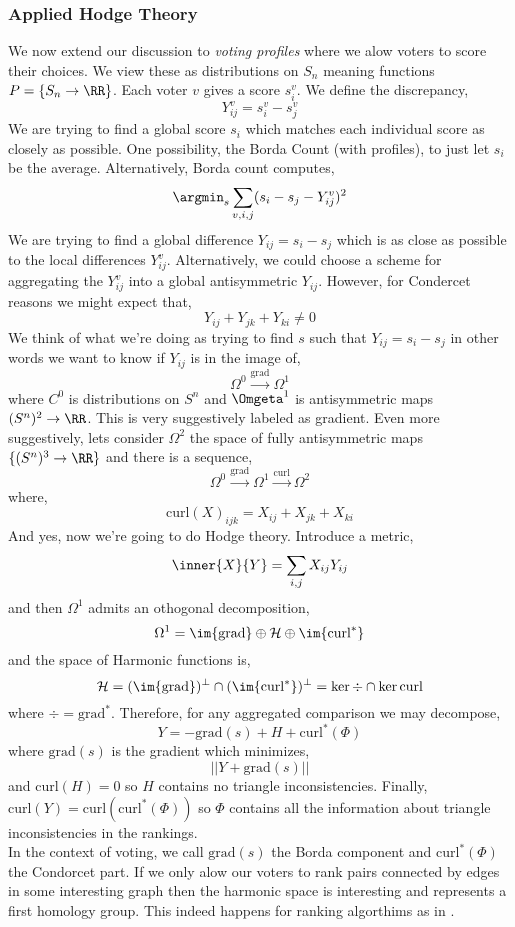 \documentclass[12pt]{article}
\begin{document}
\newcommand{\grad}{\mathrm{grad}}
\newcommand{\curl}{\mathrm{curl}}

\subsubsection{Applied Hodge Theory}

We now extend our discussion to \textit{voting profiles} where we alow voters to score their choices. We view these as distributions on $S_n$ meaning functions $P = \{ S_n \to \RR \}$. Each voter $v$ gives a score $s^v_i$. We define the discrepancy,
\[ Y^v_{ij} = s^v_i - s^v_j \]
We are trying to find a global score $s_i$ which matches each individual score as closely as possible. One possibility, the Borda Count (with profiles), to just let $s_i$ be the average. Alternatively, Borda count computes,
\[ \argmin_{s} \sum_{v, i,j} (s_i - s_j - Y_{ij}^v)^2 \]
We are trying to find a global difference $Y_{ij} = s_i - s_j$ which is as close as possible to the local differences $Y_{ij}^v$. Alternatively, we could choose a scheme for aggregating the $Y_{ij}^v$ into a global antisymmetric $Y_{ij}$. However, for Condercet reasons we might expect that,
\[ Y_{ij} + Y_{jk} + Y_{ki} \neq 0 \]
We think of what we're doing as trying to find $s$ such that $Y_{ij} = s_i - s_j$ in other words we want to know if $Y_{ij}$ is in the image of,
\[ \Omega^0 \xrightarrow{\grad} \Omega^1 \]
where $C^0$ is distributions on $S^n$ and $\Omgeta^1$ is antisymmetric maps $(S^n)^2 \to \RR$. This is very suggestively labeled as gradient. Even more suggestively, lets consider $\Omega^2$ the space of fully antisymmetric maps $\{ (S^n)^3 \to \RR \}$ and there is a sequence,
\[ \Omega^0 \xrightarrow{\grad} \Omega^1 \xrightarrow{\curl} \Omega^2 \]
where,
\[ \mathrm{curl}(X)_{ijk} = X_{ij} + X_{jk} + X_{ki} \]
And yes, now we're going to do Hodge theory. Introduce a metric, 
\[ \inner{X}{Y} = \sum_{i,j} X_{ij} Y_{ij} \]
and then $\Omega^1$ admits an othogonal decomposition,
\[ \Omega^1 = \im{\grad} \oplus \H \oplus \im{\curl^*} \]
and the space of Harmonic functions is,
\[ \H = (\im{\grad})^\perp \cap (\im{\curl^*})^\perp = \ker{\div} \cap \ker{\curl} \]
where $\div = \grad^*$.
Therefore, for any aggregated comparison we may decompose,
\[ Y = - \grad(s) + H + \curl^*(\Phi) \]
where $\grad(s)$ is the gradient which minimizes,
\[ || Y + \grad(s) || \]
and $\curl(H) = 0$ so $H$ contains no triangle inconsistencies. Finally, $\curl(Y) = \curl(\curl^*(\Phi))$ so $\Phi$ contains all the information about triangle inconsistencies in the rankings. 
\bigskip\\
In the context of voting, we call $\grad(s)$ the Borda component and $\curl^*(\Phi)$ the Condorcet part. If we only alow our voters to rank pairs connected by edges in some interesting graph then the harmonic space is interesting and represents a first homology group. This indeed happens for ranking algorthims as in .
\end{document}

